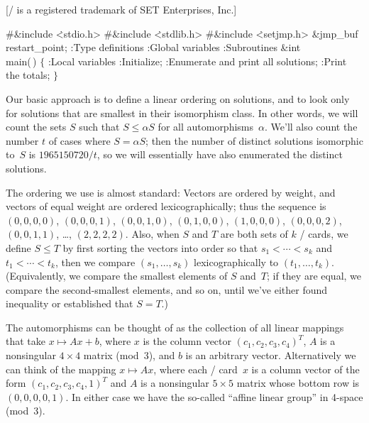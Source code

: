 [\SET/ is a registered trademark of SET Enterprises, Inc.]

\Y\B\8\#\&{include} \.{<stdio.h>}\6
\8\#\&{include} \.{<stdlib.h>}\6
\8\#\&{include} \.{<setjmp.h>}\6
\&{jmp\_buf} \\{restart\_point};\7
:Type definitions\X\6
:Global variables\X\6
:Subroutines\X\7
\1\1\&{int} \\{main}(\,)\2\2\6
${}\{{}$\1\6
:Local variables\X\6
:Initialize\X;\6
:Enumerate and print all solutions\X;\6
:Print the totals\X;\6
\4${}\}{}$\2\par
\fi

Our basic approach is to define a linear ordering on solutions, and to
look only for solutions that are smallest in their isomorphism class.
In other words, we will count the sets $S$ such that $S\le\alpha S$ for
all automorphisms~$\alpha$. We'll also count the number $t$ of cases where
$S=\alpha S$; then the number of distinct solutions isomorphic to~$S$
is $1965150720/t$, so we will essentially have also enumerated the distinct
solutions.

The ordering we use is almost standard: Vectors are ordered
by weight, and vectors of equal weight are ordered lexicographically;
thus the sequence is $(0,0,0,0)$, $(0,0,0,1)$, $(0,0,1,0)$, $(0,1,0,0)$,
$(1,0,0,0)$, $(0,0,0,2)$, $(0,0,1,1)$, \dots, $(2,2,2,2)$.
Also, when $S$ and $T$ are both sets of $k$ \SET/ cards, we define
$S\le T$ by first sorting the vectors into order so that $s_1<\cdots<s_k$ and
$t_1<\cdots<t_k$, then we compare $(s_1,\ldots,s_k)$ lexicographically
to $(t_1,\ldots,t_k)$. (Equivalently, we compare the smallest elements
of $S$ and~$T$; if they are equal, we compare the second-smallest elements,
and so on, until we've either found inequality or established that $S=T$.)

\fi

The automorphisms can be thought of as the collection of all linear
mappings that take $x\mapsto Ax+b$, where $x$ is the column vector
$(c_1,c_2,c_3,c_4)^T$, $A$ is a nonsingular $4\times4$
matrix (mod~3), and $b$ is an arbitrary vector. Alternatively we can
think of the mapping $x\mapsto Ax$, where each \SET/ card~$x$ is a
column vector of the form $(c_1,c_2,c_3,c_4,1)^T$
and $A$ is a nonsingular $5\times5$ matrix whose bottom row is $(0,0,0,0,1)$.
In either case
we have the so-called ``affine linear group'' in 4-space (mod~3).

